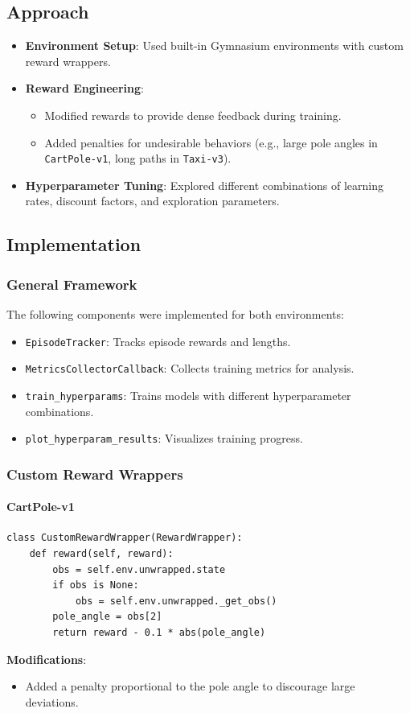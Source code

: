 \documentclass[12pt]{article}
\begin{document}
{{{\subsection*{Approach}
\begin{itemize}
    \item \textbf{Environment Setup}: Used built-in Gymnasium environments with custom reward wrappers.
    \item \textbf{Reward Engineering}:
    \begin{itemize}
        \item Modified rewards to provide dense feedback during training.
        \item Added penalties for undesirable behaviors (e.g., large pole angles in \texttt{CartPole-v1}, long paths in \texttt{Taxi-v3}).
    \end{itemize}
    \item \textbf{Hyperparameter Tuning}: Explored different combinations of learning rates, discount factors, and exploration parameters.
\end{itemize}

\subsection*{Implementation}

\subsubsection*{General Framework}
The following components were implemented for both environments:
\begin{itemize}
    \item \texttt{EpisodeTracker}: Tracks episode rewards and lengths.
    \item \texttt{MetricsCollectorCallback}: Collects training metrics for analysis.
    \item \texttt{train\_hyperparams}: Trains models with different hyperparameter combinations.
    \item \texttt{plot\_hyperparam\_results}: Visualizes training progress.
\end{itemize}

\subsubsection*{Custom Reward Wrappers}

\paragraph*{CartPole-v1}
\begin{verbatim}
class CustomRewardWrapper(RewardWrapper):
    def reward(self, reward):
        obs = self.env.unwrapped.state
        if obs is None:
            obs = self.env.unwrapped._get_obs()
        pole_angle = obs[2]
        return reward - 0.1 * abs(pole_angle)
\end{verbatim}
\textbf{Modifications}:
\begin{itemize}
    \item Added a penalty proportional to the pole angle to discourage large deviations.
\end{itemize}

}}}
\end{document}
